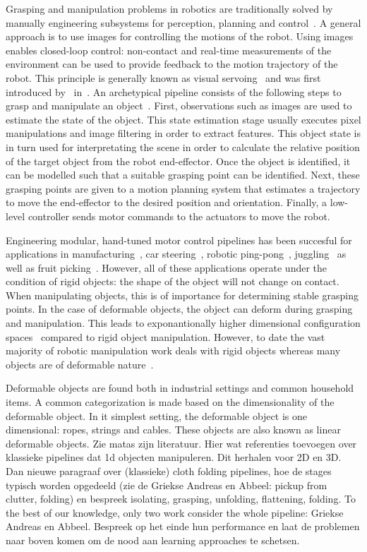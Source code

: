 \documentclass[\home/main.tex]{subfiles}
\begin{document}
Grasping and manipulation problems in robotics are traditionally solved by manually engineering subsystems for perception, planning and control~\autocite{Siciliano2008}. A general approach is to use images for controlling the motions of the robot. Using images enables closed-loop control: non-contact and real-time measurements of the environment can be used to provide feedback to the motion trajectory of the robot. This principle is generally known as visual servoing~\autocite{Hutchinson1996} and was first introduced by~\citeauthor{Hill1979} in~\citeyear{Hill1979}. An archetypical pipeline consists of the following steps to grasp and manipulate an object~\autocite{Corke1996}. First, observations such as images are used to estimate the state of the object. This state estimation stage usually executes pixel manipulations and image filtering in order to extract features. This object state is in turn used for interpretating the scene in order to calculate the relative position of the target object from the robot end-effector. Once the object is identified, it can be modelled such that a suitable grasping point can be identified. Next, these grasping points are given to a motion planning system that estimates a trajectory to move the end-effector to the desired position and orientation. Finally, a low-level controller sends motor commands to the actuators to move the robot. 

Engineering modular, hand-tuned motor control pipelines has been succesful for applications in manufacturing~\autocite{Clocksin1985,Mochizuki1987}, car steering~\autocite{Dickmanns1988}, robotic ping-pong~\autocite{Andersson1987}, juggling~\autocite{Rizzi1993} as well as fruit picking~\autocite{Harrell1989}. However, all of these applications operate under the condition of rigid objects: the shape of the object will not change on contact. When manipulating objects, this is of importance for determining stable grasping points. In the case of deformable objects, the object can deform during grasping and manipulation. This leads to exponantionally higher dimensional configuration spaces~\autocite{Foresti2004} compared to rigid object manipulation. However, to date the vast majority of robotic manipulation work deals with rigid objects whereas many objects are of deformable nature~\autocite{Siciliano2008}.

Deformable objects are found both in industrial settings and common household items. A common categorization is made based on the dimensionality of the deformable object. In it simplest setting, the deformable object is one dimensional: ropes, strings and cables. These objects are also known as linear deformable objects. Zie matas zijn literatuur. Hier wat referenties toevoegen over klassieke pipelines dat 1d objecten manipuleren. Dit herhalen voor 2D en 3D. Dan nieuwe paragraaf over (klassieke) cloth folding pipelines, hoe de stages typisch worden opgedeeld (zie de Griekse Andreas en Abbeel: pickup from clutter, folding) en bespreek isolating, grasping, unfolding, flattening, folding. To the best of our knowledge, only two work consider the whole pipeline: Griekse Andreas en Abbeel. Bespreek op het einde hun performance en laat de problemen naar boven komen om de nood aan learning approaches te schetsen.
\end{document}
